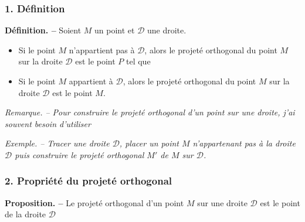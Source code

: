 \documentclass{beamer}
\newcommand{\pointilles}{{\\\rule{0pt}{1pt}\dotfill\rule{0pt}{1pt}}}
\newcommand{\rep}[1]{\foreach \n in {1,...,#1} {\pointilles}}
\begin{document}
\title{}

\date{}

\begin{frame}
  \frametitle{1. Définition}
  \textbf{Définition. --} Soient $M$ un point et $\mathcal{D}$ une droite.
    \begin{itemize}
      \item Si le point $M$ n'appartient pas à $\mathcal{D}$, alors le projeté orthogonal du point $M$ sur la droite $\mathcal{D}$ est le point $P$ tel que\\
	\dotfill
      \item Si le point $M$ appartient à $\mathcal{D}$, alors le projeté orthogonal du point $M$ sur la droite $\mathcal{D}$ est le point $M$.
    \end{itemize}

    \medskip

    \textit{Remarque. -- Pour construire le projeté orthogonal d'un point sur une droite, j'ai souvent besoin d'utiliser \dotfill}
\end{frame}

\begin{frame}
  \textit{Exemple. -- Tracer une droite $\mathcal{D}$, placer un point $M$ n'appartenant pas à la droite $\mathcal{D}$ puis construire le projeté orthogonal $M'$ de $M$ sur $\mathcal{D}$.}
  \vspace{7cm}
\end{frame}


\begin{frame}
  \frametitle{2. Propriété du projeté orthogonal}
  \textbf{Proposition. --} Le projeté orthogonal d'un point $M$ sur une droite $\mathcal{D}$ est le point de la droite $\mathcal{D}$ \dotfill

  \vspace{6cm}
\end{frame}
\end{document}
